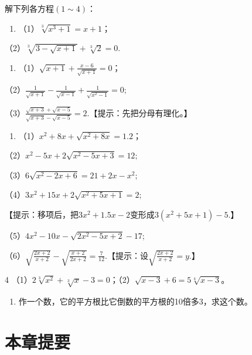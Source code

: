 解下列各方程\((1\sim4)\)：

\begin{enumerate}
\item
  （1）\(\sqrt[3]{x^3 + 1} = x + 1\)；
\end{enumerate}

（2）\(\sqrt[3]{3 - \sqrt{x + 1}} + \sqrt[3]{2} = 0.\)

\begin{enumerate}[start=2]
\item
  （1）\(\sqrt{x + 1} + \frac{x - 6}{\sqrt{x + 1}} = 0\)；
\end{enumerate}

（2）\(\frac{1}{\sqrt{x + 1}} - \frac{1}{\sqrt{x - 1}} + \frac{1}{\sqrt{x^2 - 1}} = 0;\)

（3）\(\frac{\sqrt{x + 3} + \sqrt{x - 5}}{\sqrt{x + 3} - \sqrt{x - 5}} = 2.\)【提示：先把分母有理化。】

\begin{enumerate}[start=3]
\item
  （1）\(x^{2} + 8x + \sqrt{x^{2} + 8x} = 1.2\)；
\end{enumerate}

（2）\(x^{2} - 5x + 2\sqrt{x^{2} - 5x + 3} = 12;\)

（3）\(6\sqrt{x^2 - 2x + 6} = 21 + 2x - x^2;\)

（4）\(3x^{2} + 15x + 2\sqrt{x^{2} + 5x + 1} = 2;\)

【提示：移项后，把\(3x^{2} + 1.5x - 2\)变形成\(3(x^{2} + 5x + 1) - 5.\)】

（5）\(4x^{2} - 10x - \sqrt{2x^{2} - 5x + 2} - 17;\)

（6）\(\sqrt{\frac{2x + 2}{x + 2}} -\sqrt{\frac{x + 2}{2x + 2}} = \frac{7}{12}.\)【提示：设\(\sqrt{\frac{2x + 2}{x + 2}} = y.\)】

4
（1）\(2\sqrt[3]{x^2} + \sqrt[3]{x} - 3 = 0\)；（2）\(\sqrt{x - 3} + 6 = 5\sqrt[4]{x - 3}\)。

\begin{enumerate}[start=5]
\item
  作一个数，它的平方根比它倒数的平方根的10倍多3，求这个数。
\end{enumerate}

\section{本章提要}


